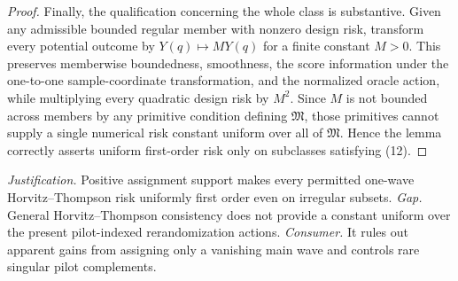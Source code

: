 \documentclass{article}
\begin{document}
\begin{proof}
Finally, the qualification concerning the whole class is substantive.  Given any admissible bounded regular member with nonzero design risk, transform every potential outcome by \(Y(q)\mapsto M Y(q)\) for a finite constant \(M>0\).  This preserves memberwise boundedness, smoothness, the score information under the one-to-one sample-coordinate transformation, and the normalized oracle action, while multiplying every quadratic design risk by \(M^2\).  Since \(M\) is not bounded across members by any primitive condition defining \(\mathfrak M\), those primitives cannot supply a single numerical risk constant uniform over all of \(\mathfrak M\).  Hence the lemma correctly asserts uniform first-order risk only on subclasses satisfying (12).
\end{proof}
\par\smallskip\noindent \textit{Justification.} Positive assignment support makes every permitted one-wave Horvitz--Thompson risk uniformly first order even on irregular subsets. \textit{Gap.} General Horvitz--Thompson consistency does not provide a constant uniform over the present pilot-indexed rerandomization actions. \textit{Consumer.} It rules out apparent gains from assigning only a vanishing main wave and controls rare singular pilot complements.
\end{document}

